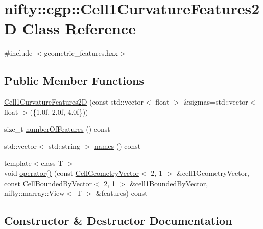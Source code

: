 \hypertarget{classnifty_1_1cgp_1_1Cell1CurvatureFeatures2D}{}\section{nifty\+:\+:cgp\+:\+:Cell1\+Curvature\+Features2\+D Class Reference}
\label{classnifty_1_1cgp_1_1Cell1CurvatureFeatures2D}


{\ttfamily \#include $<$geometric\+\_\+features.\+hxx$>$}

\subsection*{Public Member Functions}
\begin{DoxyCompactItemize}
\item 
\hyperlink{classnifty_1_1cgp_1_1Cell1CurvatureFeatures2D_af6e4ca198685673a68f2252ae140927c}{Cell1\+Curvature\+Features2\+D} (const std\+::vector$<$ float $>$ \&sigmas=std\+::vector$<$ float $>$(\{1.\+0f, 2.\+0f, 4.\+0f\}))
\item 
size\+\_\+t \hyperlink{classnifty_1_1cgp_1_1Cell1CurvatureFeatures2D_a51a8d50734cb749a97f8444b152ded06}{number\+Of\+Features} () const 
\item 
std\+::vector$<$ std\+::string $>$ \hyperlink{classnifty_1_1cgp_1_1Cell1CurvatureFeatures2D_afdec5436850e78f2a70edb4033488f19}{names} () const 
\item 
{\footnotesize template$<$class T $>$ }\\void \hyperlink{classnifty_1_1cgp_1_1Cell1CurvatureFeatures2D_a01e82615ad4742e8d6c8b74771eb2f9f}{operator()} (const \hyperlink{classnifty_1_1cgp_1_1CellGeometryVector}{Cell\+Geometry\+Vector}$<$ 2, 1 $>$ \&cell1\+Geometry\+Vector, const \hyperlink{classnifty_1_1cgp_1_1CellBoundedByVector}{Cell\+Bounded\+By\+Vector}$<$ 2, 1 $>$ \&cell1\+Bounded\+By\+Vector, nifty\+::marray\+::\+View$<$ T $>$ \&features) const 
\end{DoxyCompactItemize}


\subsection{Constructor \& Destructor Documentation}
\hypertarget{classnifty_1_1cgp_1_1Cell1CurvatureFeatures2D_af6e4ca198685673a68f2252ae140927c}{}
